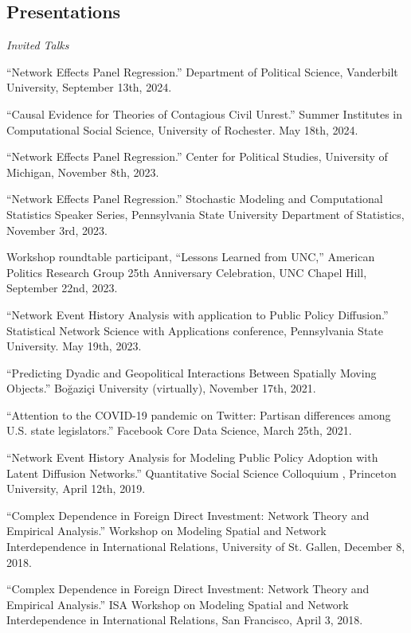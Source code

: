\documentclass[overlapped,line]{res}
\begin{document}
\begin{resume}
\section{\bf Presentations}
\vspace{.1cm}
\hspace{-1cm} \emph{Invited Talks}
\begin{etaremune} 
\item ``Network Effects Panel Regression.'' Department of Political Science, Vanderbilt University, September 13th, 2024.
\item ``Causal Evidence for Theories of Contagious Civil Unrest.'' Summer Institutes in Computational Social Science, University of Rochester. May 18th, 2024. 
\item ``Network Effects Panel Regression.'' Center for Political Studies, University of Michigan, November 8th, 2023.
\item ``Network Effects Panel Regression.'' Stochastic Modeling and Computational Statistics Speaker Series, Pennsylvania State University Department of Statistics, November 3rd, 2023.
\item Workshop roundtable participant, ``Lessons Learned from UNC,'' American Politics Research Group 25th Anniversary Celebration, UNC Chapel Hill, September 22nd, 2023. 
\item ``Network Event History Analysis with application to Public Policy Diffusion.'' Statistical Network Science with Applications conference, Pennsylvania State University. May 19th, 2023.
\item ``Predicting Dyadic and Geopolitical Interactions Between Spatially Moving Objects.'' Boğaziçi University (virtually), November 17th, 2021.
\item ``Attention to the COVID-19 pandemic on Twitter: Partisan differences among U.S. state legislators.'' Facebook Core Data Science, March 25th, 2021.
\item ``Network Event History Analysis for Modeling Public Policy Adoption with Latent Diffusion Networks.''  Quantitative Social Science Colloquium , Princeton University, April 12th, 2019.
\item ``Complex Dependence in Foreign Direct Investment: Network Theory and Empirical Analysis.'' Workshop on Modeling Spatial and Network Interdependence in International Relations, University of St. Gallen, December 8, 2018.
\item ``Complex Dependence in Foreign Direct Investment: Network Theory and Empirical Analysis.'' ISA Workshop on Modeling Spatial and Network Interdependence in International Relations, San Francisco, April 3, 2018.

\end{etaremune}
\end{resume}
\end{document}
